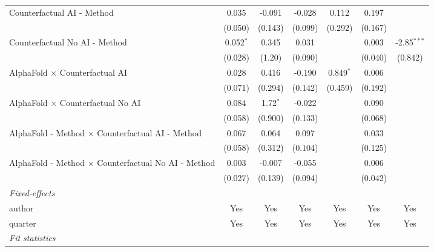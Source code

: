 \begin{tabular}{lcccccc}
   Counterfactual AI - Method                                 & 0.035       & -0.091     & -0.028  & 0.112        & 0.197   &   \\   
                                                              & (0.050)     & (0.143)    & (0.099) & (0.292)      & (0.167) &   \\   
   Counterfactual No AI - Method                              & 0.052$^{*}$ & 0.345      & 0.031   &              & 0.003   & -2.85$^{***}$\\   
                                                              & (0.028)     & (1.20)     & (0.090) &              & (0.040) & (0.842)\\   
   AlphaFold $\times$ Counterfactual AI                       & 0.028       & 0.416      & -0.190  & 0.849$^{*}$  & 0.006   &   \\   
                                                              & (0.071)     & (0.294)    & (0.142) & (0.459)      & (0.192) &   \\   
   AlphaFold $\times$ Counterfactual No AI                    & 0.084       & 1.72$^{*}$ & -0.022  &              & 0.090   &   \\   
                                                              & (0.058)     & (0.900)    & (0.133) &              & (0.068) &   \\   
   AlphaFold - Method $\times$ Counterfactual AI - Method     & 0.067       & 0.064      & 0.097   &              & 0.033   &   \\   
                                                              & (0.058)     & (0.312)    & (0.104) &              & (0.125) &   \\   
   AlphaFold - Method $\times$ Counterfactual No AI - Method  & 0.003       & -0.007     & -0.055  &              & 0.006   &   \\   
                                                              & (0.027)     & (0.139)    & (0.094) &              & (0.042) &   \\   
   \midrule
   \emph{Fixed-effects}\\
   author                                                     & Yes         & Yes        & Yes     & Yes          & Yes     & Yes\\  
   quarter                                                    & Yes         & Yes        & Yes     & Yes          & Yes     & Yes\\  
   \midrule
   \emph{Fit statistics}\\

\end{tabular}
